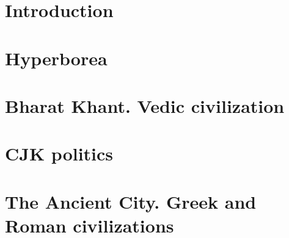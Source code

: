 \documentclass[a4paper,12pt,twoside]{book}
\begin{document}
\chapter{Introduction}



















\chapter{Hyperborea}









\chapter{Bharat Khant. Vedic civilization}





\chapter{CJK politics}







\chapter{The Ancient City. Greek and Roman civilizations}
















\end{document}
